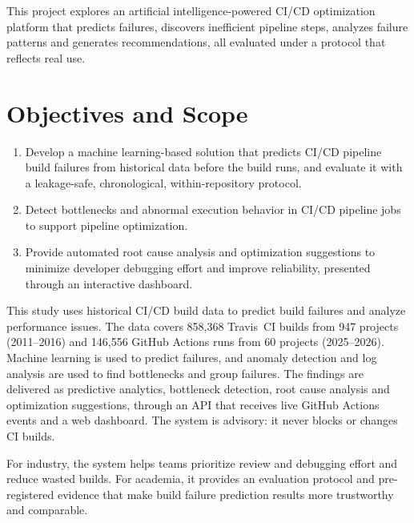This project explores an artificial intelligence-powered CI/CD optimization platform that predicts failures, discovers inefficient pipeline steps, analyzes failure patterns and generates recommendations, all evaluated under a protocol that reflects real use.

\section{Objectives and Scope}
\label{sec:objectives}
\begin{enumerate}
\item Develop a machine learning-based solution that predicts CI/CD pipeline build failures from historical data before the build runs, and evaluate it with a leakage-safe, chronological, within-repository protocol.
\item Detect bottlenecks and abnormal execution behavior in CI/CD pipeline jobs to support pipeline optimization.
\item Provide automated root cause analysis and optimization suggestions to minimize developer debugging effort and improve reliability, presented through an interactive dashboard.
\end{enumerate}

This study uses historical CI/CD build data to predict build failures and analyze performance issues. The data covers 858,368 Travis~CI builds from 947 projects (2011--2016) and 146,556 GitHub Actions runs from 60 projects (2025--2026). Machine learning is used to predict failures, and anomaly detection and log analysis are used to find bottlenecks and group failures. The findings are delivered as predictive analytics, bottleneck detection, root cause analysis and optimization suggestions, through an API that receives live GitHub Actions events and a web dashboard. The system is advisory: it never blocks or changes CI builds.

For industry, the system helps teams prioritize review and debugging effort and reduce wasted builds. For academia, it provides an evaluation protocol and pre-registered evidence that make build failure prediction results more trustworthy and comparable.
